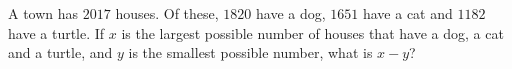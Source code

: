 A town has $2017$ houses. Of these, $1820$ have a dog, $1651$ have a cat and $1182$ have a turtle. If $x$ is the largest possible number of houses that have a dog, a cat and a turtle, and $y$ is the smallest possible number, what is $x-y$?
